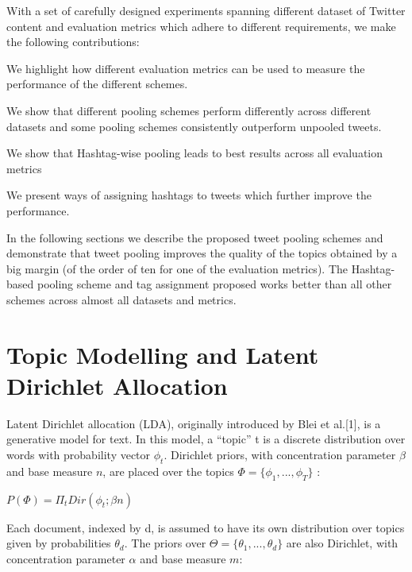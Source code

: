 \documentclass[10pt,a5paper,twoside]{article}
\begin{document}
With a set of carefully designed experiments spanning different dataset of Twitter content and evaluation metrics which adhere to different requirements, we make the following contributions:
\begin{compactitem}
\item We highlight how different evaluation metrics can be used to measure the performance of the different schemes.
\item We show that different pooling schemes perform differently across different datasets and some pooling schemes consistently outperform unpooled tweets.
\item We show that Hashtag-wise pooling leads to best results across all evaluation metrics
\item We present ways of assigning hashtags to tweets which further improve the performance.
\end{compactitem}

In the following sections we describe the proposed tweet pooling schemes  and demonstrate that tweet pooling improves the quality of the topics obtained by a big margin (of the order of ten for one of the evaluation metrics). The Hashtag-based pooling scheme and tag assignment proposed works better than all other schemes across almost all datasets and metrics. 



\section{Topic Modelling and Latent Dirichlet Allocation}

Latent Dirichlet allocation (LDA), originally introduced by Blei et al.[1], is a generative model for text. In this model, a “topic” t is a discrete distribution over words with probability vector $\phi_{t}$. Dirichlet
priors, with concentration parameter $\beta$ and base measure $n$, are placed over the topics $\Phi = \lbrace \phi_{1}, ... , \phi_{T} \rbrace $ :

\begin{center}
$P\left( \Phi \right)  = \Pi_{t}  Dir\left(  \phi_{t} ; \beta n  \right) $
\end{center}

Each document, indexed by d, is assumed to have its own distribution over topics given by probabilities $\theta_{d}$. The priors over $\Theta = \lbrace  \theta_{1}, ... , \theta_{d}  \rbrace$ are also Dirichlet, with concentration parameter $\alpha$ and base measure $m$:
\end{document}
